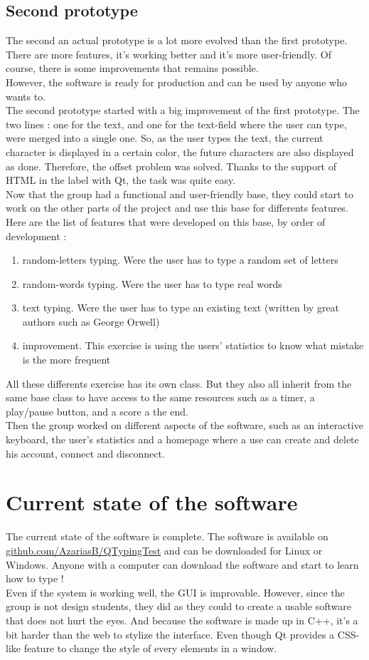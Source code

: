 \section{Second prototype}
The second an actual prototype is a lot more evolved than the first prototype. There are more features, it's working better and it's more user-friendly. Of course, there is some improvements that remains possible.\\
However, the software is ready for production and can be used by anyone who wants to.\\
The second prototype started with a big improvement of the first prototype. The two lines : one for the text, and one for the text-field where the user can type, were merged into a single one. So, as the user types the text, the current character is displayed in a certain color, the future characters are also displayed as done. Therefore, the offset problem was solved. Thanks to the support of HTML in the label with Qt, the task was quite easy.\\
Now that the group had a functional and user-friendly base, they could start to work on the other parts of the project and use this base for differents features.\\
Here are the list of features that were developed on this base, by order of development :
\begin{enumerate}
	\item random-letters typing. Were the user has to type a random set of letters
	\item random-words typing. Were the user has to type real words
	\item text typing. Were the user has to type an existing text (written by great authors such as George Orwell)
	\item improvement. This exercise is using the users' statistics to know what mistake is the more frequent
\end{enumerate}
All these differents exercise has its own class. But they also all inherit from the same base class to have access to the same resources such as a timer, a play/pause button, and a score a the end.\\
Then the group worked on different aspects of the software, such as an interactive keyboard, the user's statistics and a homepage where a use can create and delete his account, connect and disconnect.


\chapter{Current state of the software}
The current state of the software is complete. The software is available on \url{github.com/AzariasB/QTypingTest} and can be downloaded for Linux or Windows. Anyone with a computer can download the software and start to learn how to type !\\
Even if the system is working well, the GUI is improvable. However, since the group is not design students, they did as they could to create a usable software that does not hurt the eyes. And because the software is made up in C++, it's a bit harder than the web to stylize the interface. Even though Qt provides a CSS-like feature to change the style of every elements in a window.


